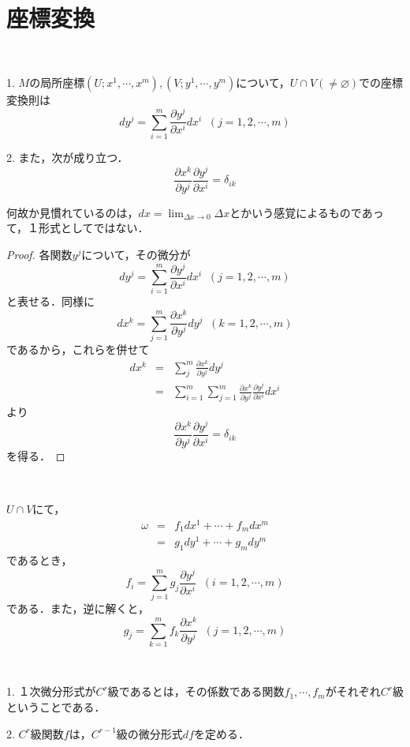 \documentclass[uplatex, dvipdfmx]{jsreport}
\begin{document}
\section{座標変換}

\begin{proposition}[１次微分形式間の座標変換]　
    
    1. $M$の局所座標$(U;x^1,\cdots,x^m),(V;y^1,\cdots,y^m)$について，$U\cap V(\ne\varnothing)$での座標変換則は
    \[dy^j = \sum^m_{i=1}\frac{\partial y^j}{\partial x^i}dx^i\;\;(j=1,2,\cdots,m)\]

    2. また，次が成り立つ．
    \[ \frac{\partial x^k}{\partial y^j}\frac{\partial y^j}{\partial x^i} = \delta_{ik} \]
\end{proposition}
\begin{remark}
    何故か見慣れているのは，$dx=\lim_{\Delta x\to 0}\Delta x$とかいう感覚によるものであって，１形式としてではない．
\end{remark}
\begin{proof}
    各関数$y^j$について，その微分が
\[dy^j = \sum^m_{i=1}\frac{\partial y^j}{\partial x^i}dx^i\;\;(j=1,2,\cdots,m)\]
と表せる．同様に
\[ dx^k = \sum^m_{j=1}\frac{\partial x^k}{\partial y^j}dy^j\;\; (k=1,2,\cdots,m) \]
であるから，これらを併せて
\begin{eqnarray*}
    dx^k &=& \sum^m_j\frac{\partial x^k}{\partial y^j}dy^j \\
    &=& \sum^m_{i=1}\sum^m_{j=1}\frac{\partial x^k}{\partial y^j}\frac{\partial y^j}{\partial x^i}dx^i
\end{eqnarray*}
より
\[ \frac{\partial x^k}{\partial y^j}\frac{\partial y^j}{\partial x^i} = \delta_{ik} \]
を得る．
\end{proof}

\begin{proposition}　

    $U\cap V$にて，
    \begin{eqnarray*}
        \omega &=& f_1dx^1+\cdots+f_mdx^m \\
        &=& g_1dy^1+\cdots+g_mdy^m
    \end{eqnarray*}
    であるとき，
    \[ f_i=\sum^m_{j=1}g_j\frac{\partial y^j}{\partial x^i}\;\; (i=1,2,\cdots,m) \]
    である．また，逆に解くと，
    \[ g_j=\sum^m_{k=1}f_k\frac{\partial x^k}{\partial y^j}\;\; (j=1,2,\cdots,m) \]
\end{proposition}

\begin{definition}　

    1. １次微分形式が$C^r$級であるとは，その係数である関数$f_1,\cdots,f_m$がそれぞれ$C^r$級ということである．

    2. $C^r$級関数$f$は，$C^{r-1}$級の微分形式$df$を定める．
\end{definition}
\end{document}
